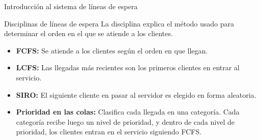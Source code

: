 \begin{frame}{Introducción al sistema de líneas de espera}
	\begin{block}{Disciplinas de líneas de espera}
		La disciplina explica el método usado para determinar el orden en el que se atiende a los clientes.
	\end{block}
	
	\pause
	\begin{itemize}
		\item \textbf{FCFS:} Se atiende a los clientes según el orden en que llegan.
		\pause
		\item\textbf{LCFS:} Las llegadas más recientes son los primeros clientes en entrar al servicio.
		\pause
		\item\textbf{SIRO:} El siguiente cliente en pasar al servidor es elegido en forma aleatoria.
		\pause
		\item\textbf{Prioridad en las colas:} Clasifica cada llegada en una categoría. Cada categoría recibe luego un nivel de prioridad, y dentro de cada nivel de prioridad, los clientes entran en el servicio siguiendo FCFS.
		
	\end{itemize}
\end{frame}